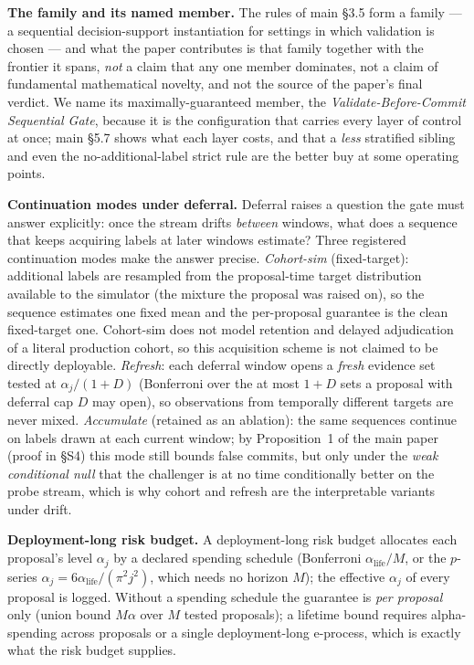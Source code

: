 \documentclass[a4paper,11pt]{article}
\begin{document}
\textbf{The family and its named member.} The rules of main \S3.5 form a family --- a sequential
decision-support instantiation for settings in which validation is chosen --- and what the paper
contributes is that family together with the frontier it spans, \emph{not} a claim that any one
member dominates, not a claim of fundamental mathematical novelty, and not the source of the
paper's final verdict. We name its maximally-guaranteed member, the \emph{Validate-Before-Commit
Sequential Gate}, because it is the configuration that carries every layer of control at once;
main \S5.7 shows what each layer costs, and that a \emph{less} stratified sibling and even the
no-additional-label strict rule are the better buy at some operating points.

\textbf{Continuation modes under deferral.} Deferral raises a question the gate must answer
explicitly: once the stream drifts \emph{between} windows, what does a sequence that keeps
acquiring labels at later windows estimate? Three registered continuation modes make the answer
precise. \emph{Cohort-sim} (fixed-target): additional labels are resampled from the proposal-time
target distribution available to the simulator (the mixture the proposal was raised on), so the
sequence estimates one fixed mean and the per-proposal guarantee is the clean fixed-target one.
Cohort-sim does not model retention and delayed adjudication of a literal production cohort, so
this acquisition scheme is not claimed to be directly deployable. \emph{Refresh}: each deferral
window opens a \emph{fresh} evidence set tested at $\alpha_j/(1+D)$ (Bonferroni over the at most
$1+D$ sets a proposal with deferral cap $D$ may open), so observations from temporally different
targets are never mixed. \emph{Accumulate} (retained as an ablation): the same sequences continue
on labels drawn at each current window; by Proposition~1 of the main paper (proof in \S S4) this
mode still bounds false commits, but only under the \emph{weak conditional null} that the
challenger is at no time conditionally better on the probe stream, which is why cohort and
refresh are the interpretable variants under drift.

\textbf{Deployment-long risk budget.} A deployment-long risk budget allocates each proposal's
level $\alpha_j$ by a declared spending schedule (Bonferroni $\alpha_{\mathrm{life}}/M$, or the
$p$-series $\alpha_j = 6\alpha_{\mathrm{life}}/(\pi^2 j^2)$, which needs no horizon $M$); the
effective $\alpha_j$ of every proposal is logged. Without a spending schedule the guarantee is
\emph{per proposal} only (union bound $M\alpha$ over $M$ tested proposals); a lifetime bound
requires alpha-spending across proposals or a single deployment-long e-process, which is exactly
what the risk budget supplies.
\end{document}
